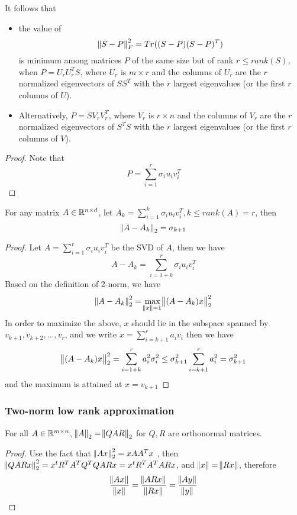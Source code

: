\begin{refsection}
\begin{corollary}
It follows that
\begin{itemize}
	\item the value of 
	$$\norm{S-P}_F^2 = Tr((S-P)(S-P)^T)$$
	is minimum among matrices $P$ of the same size but of rank $r \leq rank(S)$, when $P = U_rU^T_rS$, where $U_r$ is $m\times r$ and the columns of $U_r$ are the $r$ normalized eigenvectors of $SS^T$ with the $r$ largest eigenvalues (or the first $r$ columns of $U$).  
	\item Alternatively,  $P = SV_rV_r^T$, where $V_r$ is $r\times n$ and the columns of $V_r$ are the $r$ normalized eigenvectors of $S^TS$ with the $r$ largest eigenvalues (or the first $r$ columns of $V$).
\end{itemize}
\end{corollary}
\begin{proof}
Note that 	$$P = \sum_{i=1}^r \sigma_i u_i v_i^T$$
\end{proof}


\begin{lemma}
For any matrix $A\in \mathbb{R}^{n\times d}$, let $A_k = \sum_{i=1}^k \sigma_i u_iv_i^T, k\leq rank(A)=r$, then
$$\norm{A-A_k}_2 = \sigma_{k+1}$$
\end{lemma}
\begin{proof}
Let $A = \sum_{i=1}^r \sigma_i u_iv_i^T$ be the SVD of $A$, then we have
$$A-A_k = \sum_{i=1+k}^r \sigma_i u_iv_i^T$$
Based on the definition of 2-norm, we have
$$\norm{A-A_k}^2_2 = \max_{\norm{x}=1} \norm{(A-A_k)x}^2_2$$
In order to maximize the above, $x$ should lie in the subspace spanned by $v_{k+1},v_{k+2},...,v_r$, and we write $x=\sum_{i=k+1}^r a_i v_i$
then we have
$$\norm{(A-A_k)x}^2_2 = \sum_{i=1+k}^r a_i^2 \sigma_i^2 \leq \sigma^2_{k+1}\sum_{i=k+1}^r a_i^2 =\sigma^2_{k+1} $$
and the maximum is attained at $x=v_{k+1}$
\end{proof}




\subsubsection{Two-norm low rank approximation}
\begin{lemma}
	For all $A\in \mathbb{R}^{m\times n}$, $\norm{A}_2 = \norm{QAR}_2$ for $Q,R$ are orthonormal matrices. 
\end{lemma}
\begin{proof}
	Use the fact that $\norm{Ax}_2^2 = xAA^Tx$ , then $\norm{QARx}_2^2 = x^tR^TA^TQ^TQARx = x^tR^TA^TARx $, and $\norm{x} = \norm{Rx}$, therefore
	$$\frac{\norm{Ax}}{\norm{x}} = \frac{\norm{ARx}}{\norm{Rx}} = \frac{\norm{Ay}}{\norm{y}}$$
\end{proof}



\end{refsection}
